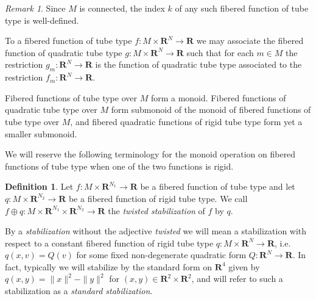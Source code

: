 \documentclass{amsart}
\newcommand\cT{\mathcal{T}}
\def\bR{\mathbf{R}}
\theoremstyle{definition}
\newtheorem{definition}[theorem]{Definition}
\theoremstyle{remark}
\newtheorem{inductive lemma}[theorem]{Inductive Lemma}
\newtheorem{remark}[theorem]{Remark}
\begin{document}
\begin{remark} Since $M$ is connected, the index $k$ of any such fibered function of tube type is well-defined. \end{remark}


To a fibered function of tube type $f:M \times \bR^N \to \bR$ we may associate the fibered function of quadratic tube type $g:M \times \bR^N \to \bR$ such that for each $m \in M$ the restriction $g_m:\bR^N \to \bR$ is the function of quadratic tube type associated to the restriction $f_m:\bR^N \to \bR$. 

Fibered functions of tube type over $M$ form a monoid. Fibered functions of quadratic tube type over $M$ form submonoid of the monoid of fibered functions of tube type over $M$, and fibered quadratic functions of rigid tube type form yet a smaller submonoid. 


We will reserve the following terminology for the monoid operation on fibered functions of tube type when one of the two functions is rigid. 

\begin{definition}
\label{def: TwistedSister}
Let $f:M \times \bR^{N_1} \to \bR$ be a fibered function of tube type and let $q:M \times \bR^{N_2}\to \bR$ be a fibered function of rigid tube type. We call $f\oplus q:M \times \bR^{N_1} \times \bR^{N_2} \to \bR$ the {\em{twisted stabilization}} of $f$ by $q$. 
\end{definition}

By a {\em{stabilization}} without the adjective {\em twisted} we will mean a stabilization with respect to a constant fibered function of rigid tube type $q:M \times \bR^N \to \bR$, i.e. $q(x,v)=Q(v)$ for some fixed non-degenerate quadratic form $Q: \bR^N \to \bR$. In fact, typically we will stabilize by the standard form on $\bR^4$ given by  $q(x,y)=\|x\|^2-\|y\|^2$ for $(x,y) \in \bR^{2} \times \bR^{2}$, and will refer to such a stabilization as a {\em standard stabilization}. 
\end{document}
